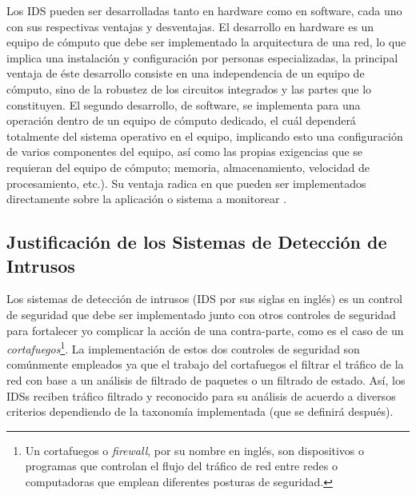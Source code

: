 Los IDS pueden ser desarrolladas tanto en hardware como en software, cada uno con sus respectivas ventajas y desventajas. El desarrollo en hardware es un equipo de cómputo que debe ser implementado la arquitectura de una red, lo que implica una instalación y configuración por personas especializadas, la principal ventaja de éste desarrollo consiste en una independencia de un equipo de cómputo, sino de la robustez de los circuitos integrados y las partes que lo constituyen. El segundo desarrollo, de software, se implementa para una operación dentro de un equipo de cómputo dedicado, el cuál dependerá totalmente del sistema operativo en el equipo, implicando esto una configuración de varios componentes del equipo, así como las propias exigencias que se requieran del equipo de cómputo; memoria, almacenamiento, velocidad de procesamiento, etc.). Su ventaja radica en que pueden ser implementados directamente sobre la aplicación o sistema a monitorear \cite{dieciseis}. \\

\subsection{Justificación de los Sistemas de Detección de Intrusos}

Los sistemas de detección de intrusos (IDS por sus siglas en inglés) es un control de seguridad que debe ser implementado junto con otros controles de seguridad para fortalecer y\/o complicar la acción de una contra-parte, como es el caso de un \textit{cortafuegos}\footnote{Un cortafuegos o \textit{firewall}, por su nombre en inglés, son dispositivos o programas que controlan el flujo del tráfico de red entre redes o computadoras que emplean diferentes posturas de seguridad\cite{nist41}.}. La implementación de estos dos controles de seguridad son comúnmente empleados ya que el trabajo del cortafuegos el filtrar el tráfico de la red con base a un análisis de filtrado de paquetes o un filtrado de estado. Así, los IDSs reciben tráfico filtrado y reconocido para su análisis de acuerdo a diversos criterios dependiendo de la taxonomía implementada (que se definirá después). 
\\

